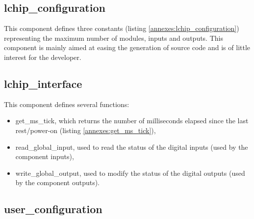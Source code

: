 

\subsection{lchip\_configuration}

This component defines three constants (listing \ref{annexes:lchip_configuration}) representing the maximum number of modules, inputs and outputs. This component is mainly aimed at easing the generation of source code and is of little interest for the developer. 


\subsection{lchip\_interface}

This component defines several functions:
\begin{itemize}
    \item get\_ms\_tick, which returns the number of milliseconds elapsed since the last rest/power-on (listing \ref{annexes:get_ms_tick}),
    \item read\_global\_input, used to read the status of the digital inputs (used by the component inputs),
    \item write\_global\_output, used to modify the status of the digital outputs (used by the component outputs).
\end{itemize}


\subsection{user\_configuration}

